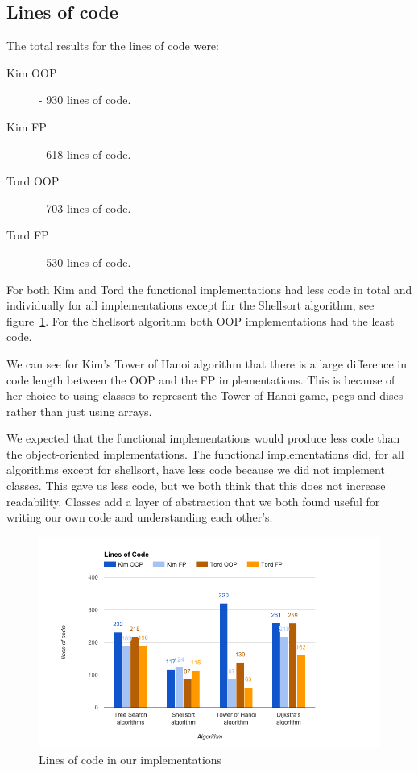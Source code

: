 \documentclass {article}
\begin{document}
\subsection{Lines of code}
The total results for the lines of code were:
\begin{description}
\item[Kim OOP] - 930 lines of code.
\item[Kim FP] - 618 lines of code.
\item[Tord OOP] - 703 lines of code.
\item[Tord FP] - 530 lines of code.
\end{description}

For both Kim and Tord the functional implementations had less code in total and individually for all implementations except for the Shellsort algorithm, see figure~\ref{fig:lines-of-code-graph}. For the Shellsort algorithm both OOP implementations had the least code. 

We can see for Kim's Tower of Hanoi algorithm that there is a large difference in code length between the OOP and the FP implementations. This is because of her choice to using classes to represent the Tower of Hanoi game, pegs and discs rather than just using arrays.

We expected that the functional implementations would produce less code than the object-oriented implementations. The functional implementations did, for all algorithms except for shellsort, have less code because we did not implement classes. This gave us less code, but we both think that this does not increase readability. Classes add a layer of abstraction that we both found useful for writing our own code and understanding each other's.

\begin{figure}[H]
\centering
\includegraphics[width=\textwidth]{lines-of-code-graph}

\caption{Lines of code in our implementations}
\label{fig:lines-of-code-graph}
\end{figure}
\end{document}
